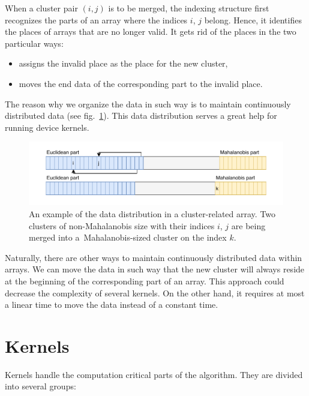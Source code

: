 When a cluster pair $(i,j)$ is to be merged, the indexing structure first recognizes the parts of an array where the indices $i$, $j$ belong. Hence, it identifies the places of arrays that are no longer valid. It gets rid of the places in the two particular ways:
\begin{itemize}
	\item assigns the invalid place as the place for the new cluster,
	\item moves the end data of the corresponding part to the invalid place.
\end{itemize}
The reason why we organize the data in such way is to maintain continuously distributed data (see fig.~\ref{fig03:data_order}). This data distribution serves a great help for running device kernels.

\begin{figure}\centering
	\includegraphics[width=\textwidth]{img/data}
	\caption{An example of the data distribution in a cluster-related array. Two clusters of non-Mahalanobis size with their indices $i$, $j$ are being merged into a~Mahalanobis-sized cluster on the index $k$.}
	\label{fig03:data_order}
\end{figure}

\begin{rem}
	Naturally, there are other ways to maintain continuously distributed data within arrays. We can move the data in such way that the new cluster will always reside at the beginning of the corresponding part of an array. This approach could decrease the complexity of several kernels. On the other hand, it requires at most a linear time to move the data instead of a constant time.
\end{rem}

\section{Kernels}

Kernels handle the computation critical parts of the algorithm. They are divided into several groups:

